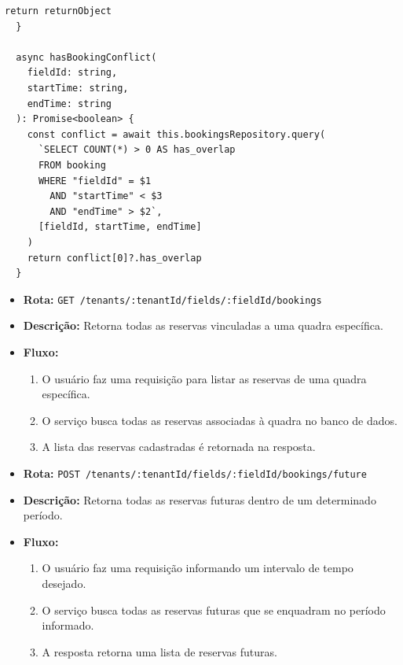 \begin{lstlisting}[caption={Exemplo de \textit{controller} para \textit{login}.},label={cod:create-booking-service}]
    return returnObject
  }

  async hasBookingConflict(
    fieldId: string,
    startTime: string,
    endTime: string
  ): Promise<boolean> {
    const conflict = await this.bookingsRepository.query(
      `SELECT COUNT(*) > 0 AS has_overlap
      FROM booking
      WHERE "fieldId" = $1
        AND "startTime" < $3
        AND "endTime" > $2`,
      [fieldId, startTime, endTime]
    )
    return conflict[0]?.has_overlap
  }
\end{lstlisting}

\begin{itemize}
    \item \textbf{Rota:} \texttt{GET /tenants/:tenantId/fields/:fieldId/bookings}
    \item \textbf{Descrição:} Retorna todas as reservas vinculadas a uma quadra específica.
    \item \textbf{Fluxo:}
    \begin{enumerate}
        \item O usuário faz uma requisição para listar as reservas de uma quadra específica.
        \item O serviço busca todas as reservas associadas à quadra no banco de dados.
        \item A lista das reservas cadastradas é retornada na resposta.
    \end{enumerate}
\end{itemize}

\begin{itemize}
    \item \textbf{Rota:} \texttt{POST /tenants/:tenantId/fields/:fieldId/bookings/future}
    \item \textbf{Descrição:} Retorna todas as reservas futuras dentro de um determinado período.
    \item \textbf{Fluxo:}
    \begin{enumerate}
        \item O usuário faz uma requisição informando um intervalo de tempo desejado.
        \item O serviço busca todas as reservas futuras que se enquadram no período informado.
        \item A resposta retorna uma lista de reservas futuras.
    \end{enumerate}
\end{itemize}

